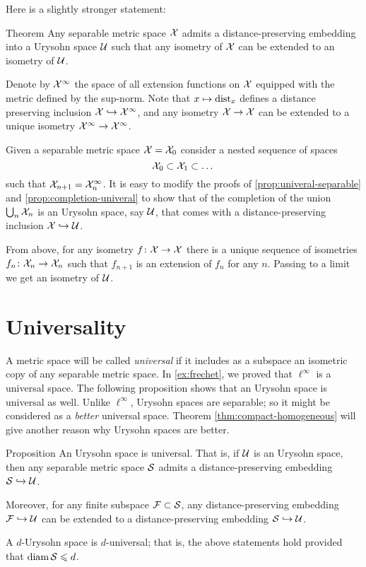Here is a slightly stronger statement:

\begin{thm}{Theorem}\label{thm:urysohn-exists+}
Any separable metric space $\mathcal{X}$ admits a distance-preserving embedding into a Urysohn space $\mathcal{U}$ such that any isometry of $\mathcal{X}$ can be extended to an isometry of $\mathcal{U}$.
\end{thm}

Denote by $\mathcal{X}^\infty$ the space of all extension functions on $\mathcal{X}$ equipped with the metric defined by the sup-norm.
Note that $x\mapsto \mathrm{dist}_x$ defines a distance preserving inclusion $\mathcal{X} \hookrightarrow\mathcal{X}^\infty$, and
any isometry $\mathcal{X}\to \mathcal{X}$ can be extended to a unique isometry $\spc{X}^\infty\z\to \spc{X}^\infty$.

Given a separable metric space $\mathcal{X}=\mathcal{X}_0$ consider a nested sequence of spaces 
\[\mathcal{X}_0\subset \mathcal{X}_1\subset\dots\]
such that $\mathcal{X}_{n+1}=\mathcal{X}_{n}^\infty$.
It is easy to modify the proofs of \ref{prop:univeral-separable} and \ref{prop:completion-univeral} to show that of the completion of the union $\bigcup_n\mathcal{X}_{n}$ is an Urysohn space, say $\mathcal{U}$, that comes with a distance-preserving inclusion $\mathcal{X}\hookrightarrow \mathcal{U}$.

From above, for any isometry $f\colon \mathcal{X}\to \mathcal{X}$ there is a unique sequence of isometries $f_{n}\colon \mathcal{X}_{n}\to \mathcal{X}_{n}$ such that $f_{n+1}$ is an extension of $f_n$ for any $n$.
Passing to a limit we get an isometry of $\mathcal{U}$.
\qeds


\section{Universality}

A metric space will be called \emph{universal} if it includes as a subspace an isometric copy of any separable metric space.
In \ref{ex:frechet}, we proved that $\ell^\infty$ is a universal space. 
The following proposition shows that an Urysohn space is universal as well.
Unlike $\ell^\infty$, Urysohn spaces are separable;
so it might be considered as a \emph{better} universal space.
Theorem \ref{thm:compact-homogeneous} will give another reason why Urysohn spaces are better.

\begin{thm}{Proposition}\label{prop:sep-in-urys}
An Urysohn space is universal.
That is, if $\mathcal{U}$ is an Urysohn space, then any separable metric space $\mathcal{S}$ admits a distance-preserving embedding $\mathcal{S}\hookrightarrow\mathcal{U}$.

Moreover, for any finite subspace $\mathcal{F}\subset \mathcal{S}$,
any distance-preserving embedding $\mathcal{F}\hookrightarrow \mathcal{U}$ can be extended to a distance-preserving embedding $\mathcal{S}\hookrightarrow\mathcal{U}$.

A $d$-Urysohn space is $d$-universal;
that is, the above statements hold provided that $\operatorname{\rm diam}\nolimits\mathcal{S}\leqslant d$.  
\end{thm}

